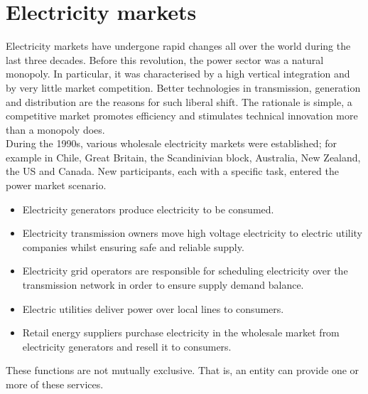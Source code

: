 \section{Electricity markets}
Electricity markets have undergone rapid changes all over the world during the last three decades.
Before this revolution, the power sector was a natural monopoly. In particular, it was characterised by a high vertical integration and by very little market competition. Better technologies in transmission, generation and distribution are the reasons for such liberal shift. The rationale is simple, a competitive market promotes efficiency and stimulates technical innovation more than a monopoly does.
\\
During the 1990s, various wholesale electricity markets were established; for example in Chile, Great Britain, the Scandinivian block, Australia, New Zealand, the US and Canada. New participants, each with a specific task, entered the power market scenario.
\begin{itemize}
    \item Electricity generators produce electricity to be consumed.
    \item Electricity transmission owners 
    move high voltage electricity to electric utility companies whilst ensuring safe and reliable supply.
    \item Electricity grid operators are responsible for scheduling electricity over the transmission network in order to ensure supply demand balance.
    \item Electric utilities deliver power over local lines to consumers. 
    \item Retail energy suppliers purchase electricity in the wholesale market from electricity generators and resell it to consumers.
\end{itemize}
These functions are not mutually exclusive. That is, an entity can provide one or more of these services.


